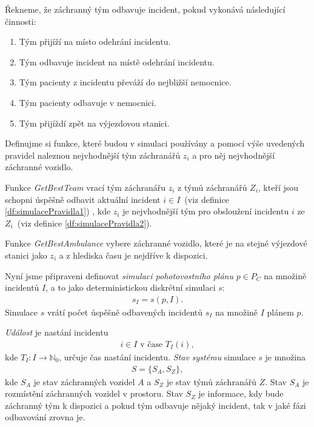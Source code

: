 \begin{definice}\label{df:odbavujeIncident}
  Řekneme, že záchranný tým odbavuje incident, pokud vykonává následující činnosti:
  \begin{enumerate}
    \item
      Tým přijíží na místo odehrání incidentu.

    \item
      Tým odbavuje incident na místě odehrání incidentu.

    \item
      Tým pacienty z incidentu převáží do nejbližší nemocnice.

    \item
      Tým pacienty odbavuje v nemocnici.

    \item
      Tým přijíždí zpět na výjezdovou stanici.
  \end{enumerate}
\end{definice}
Definujme si funkce, které budou v simulaci používány a pomocí výše uvedených pravidel naleznou nejvhodnější tým záchranářů $z_i$
a pro něj nejvhodnější záchranné vozidlo.
\begin{definice}[GetBestTeam]\label{df:getBestTeam}
Funkce \textit{GetBestTeam} vrací tým záchranářu $z_i$ z týmů záchranářů $Z_i$, kteří jsou schopni úspěšně odbavit aktuální incident $i \in I$~(viz definice \ref{df:simulacePravidla1})
  , kde $z_i$ je nejvhodnější tým pro obsloužení incidentu $i$ ze $Z_i$~(viz definice \ref{df:simulacePravidla2}). 
\end{definice}
\begin{definice}[GetBestAmbulance]
Funkce \textit{GetBestAmbulance}\label{df:getBestAmbulance} vybere záchranné vozidlo, které je na stejné výjezdové stanici jako $z_i$ a z hlediska času je nejdříve k dispozici.
\end{definice}

Nyní jsme připraveni definovat \textit{simulaci pohotovostního plánu} $p \in P_C$ na množině incidentů $I$, a to jako deterministickou diskrétní simulaci $s$:
\begin{align*}
  s_I = s(p, I).
\end{align*}
Simulace $s$ vrátí počet úspěšně odbavených incidentů $s_I$ na množině $I$ plánem $p$. 

\textit{Událost} je nastání incidentu 
\begin{align*}
  i \in I \text{ v čase } T_I(i),
\end{align*}
kde $T_I \colon I \rightarrow \mathbb{N}_0$, určuje čas nastání incidentu.
\textit{Stav systému} simulace $s$ je množina
\begin{align*}
S = \{ S_A, S_Z \},
\end{align*}
kde $S_A$ je stav záchranných vozidel $A$ a $S_Z$ je stav týmů záchranářů $Z$. 
Stav $S_A$ je rozmístění záchranných vozidel v prostoru.
Stav $S_Z$ je informace, kdy bude záchranný tým k dispozici a pokud tým odbavuje nějaký incident, tak v jaké fázi odbavování zrovna je. 

